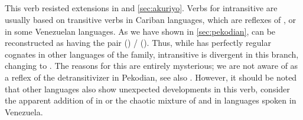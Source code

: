 \subsection{ }
\label{sec:bathe}
This verb resisted extensions in \PPek {} and \akuriyo \cref{sec:akuriyo}.
Verbs for intransitive  are usually based on transitive verbs in Cariban languages, which are reflexes of , or  in some Venezuelan languages.
As we have shown in \cref{sec:pekodian}, \PPek can be reconstructed as having the pair  () /  ().
Thus, while \PPek {} has perfectly regular cognates in other languages of the family, intransitive  is divergent in this branch, changing  to .
The reasons for this are entirely mysterious; we are not aware of  as a reflex of the detransitivizer in Pekodian, see also \textcite[506]{meira2010origin}.
However, it should be noted that other languages also show unexpected developments in this verb, consider the apparent addition of  in \hixka or the chaotic mixture of  and  in languages spoken in Venezuela.



